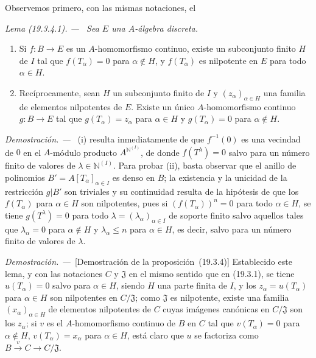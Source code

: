 \documentclass[10pt,oneside]{book}
\makeatletter
\newcommand{\setmanualcurrentlabel}[1]{\def\@currentlabel{#1}}
\newcommand{\oldpage}[2][]{%
  \setcounter{footnote}{0}%
  \marginpar{\scriptsize\textbf{#1}~|~#2}\ignorespaces}
\newenvironment{lemma}[1][]{%
  \setmanualcurrentlabel{#1}\par\medskip\noindent\itshape Lema (#1). ---\ }{\par}
\newenvironment{proof}{%
  \par\medskip\noindent\textit{Demostración. ---\ }}{\par}
\makeatother
\begin{document}
Observemos primero, con las mismas notaciones, el
\begin{lemma}[19.3.4.1]
\label{0.19.3.4.1-es}
Sea $E$ una $A$-álgebra discreta.
\begin{enumerate}
  \item[\textup{(i)}] Si $f:B\to E$ es un $A$-homomorfismo continuo, existe un
  subconjunto finito $H$ de $I$ tal que $f(T_\alpha)=0$ para $\alpha\notin H$,
  y $f(T_\alpha)$ es nilpotente en $E$ para todo $\alpha\in H$.
  \item[\textup{(ii)}] Recíprocamente, sean $H$ un subconjunto finito de $I$ y
  $(z_\alpha)_{\alpha\in H}$ una familia de elementos nilpotentes de $E$.
  Existe un único $A$-homomorfismo continuo $g:B\to E$ tal que
  $g(T_\alpha)=z_\alpha$ para $\alpha\in H$ y
  $g(T_\alpha)=0$ para $\alpha\notin H$.
\end{enumerate}
\end{lemma}

\oldpage[0\textsubscript{IV-1}]{81}

\begin{proof}
(i) resulta inmediatamente de que $f^{-1}(0)$ es una vecindad de $0$ en el
$A$-módulo producto $A^{\mathbb{N}^{(I)}}$, de donde $f(T^\lambda)=0$ salvo para un
número finito de valores de $\lambda\in\mathbb{N}^{(I)}$. Para probar (ii),
basta observar que el anillo de polinomios
$B'=A[T_\alpha]_{\alpha\in I}$ es denso en $B$; la existencia y
la unicidad de la restricción $g|B'$ son triviales y su continuidad resulta de
la hipótesis de que los $f(T_\alpha)$ para $\alpha\in H$ son nilpotentes,
pues si $(f(T_\alpha))^n=0$ para todo $\alpha\in H$, se tiene
$g(T^\lambda)=0$ para todo $\lambda=(\lambda_\alpha)_{\alpha\in I}$ de
soporte finito salvo aquellos tales que $\lambda_\alpha=0$ para
$\alpha\notin H$ y $\lambda_\alpha\leq n$ para
$\alpha\in H$, es decir, salvo para un número finito de valores de
$\lambda$.
\end{proof}

\begin{proof}[Demostración de la proposición~{\rm(19.3.4)}]
Establecido este lema, y con las notaciones $C$ y $\mathfrak J$ en el mismo
sentido que en (19.3.1), se tiene $u(T_\alpha)=0$ salvo para
$\alpha\in H$, siendo $H$ una parte finita de $I$, y los
$z_\alpha=u(T_\alpha)$ para $\alpha\in H$ son nilpotentes en
$C/\mathfrak J$; como $\mathfrak J$ es nilpotente, existe una familia
$(x_\alpha)_{\alpha\in H}$ de elementos nilpotentes de $C$ cuyas imágenes
canónicas en $C/\mathfrak J$ son los $z_\alpha$; si $v$ es el
$A$-homomorfismo continuo de $B$ en $C$ tal que
$v(T_\alpha)=0$ para $\alpha\notin H$, $v(T_\alpha)=x_\alpha$ para
$\alpha\in H$, está claro que $u$ se factoriza como
$B\xrightarrow{v}C\to C/\mathfrak J$.
\end{proof}
\end{document}
